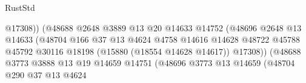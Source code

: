 \begin{lexlean}{RustStd}
\begin{coremodule}
                                                      @17308))
                                                  (@48688
                                                    @2648
                                                    @3889
                                                    @13
                                                    @20
                                                    @14633
                                                    @14752
                                                    (@48696
                                                      @2648
                                                      @13
                                                      @14633
                                                      (@48704
                                                        @166
                                                        @37
                                                        @13
                                                        @4624
                                                        @4758
                                                        @14616
                                                        @14628
                                                        @48722
                                                        @45788
                                                        @45792
                                                        @30116
                                                        @18198
                                                        (@15880 (@18554 @14628 @14617))
                                                        @17308))
                                                    (@48688
                                                      @3773
                                                      @3888
                                                      @13
                                                      @19
                                                      @14659
                                                      @14751
                                                      (@48696
                                                        @3773
                                                        @13
                                                        @14659
                                                        (@48704
                                                          @290
                                                          @37
                                                          @13
                                                          @4624

\end{coremodule}
\end{lexlean}
